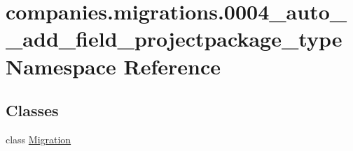 \hypertarget{namespacecompanies_1_1migrations_1_10004__auto____add__field__projectpackage__type}{\section{companies.\-migrations.0004\-\_\-auto\-\_\-\-\_\-add\-\_\-field\-\_\-projectpackage\-\_\-type Namespace Reference}
\label{namespacecompanies_1_1migrations_1_10004__auto____add__field__projectpackage__type}
}
\subsection*{Classes}
\begin{DoxyCompactItemize}
\item 
class \hyperlink{classcompanies_1_1migrations_1_10004__auto____add__field__projectpackage__type_1_1_migration}{Migration}
\end{DoxyCompactItemize}
